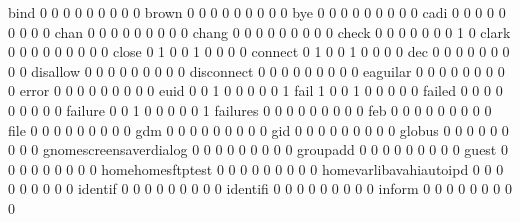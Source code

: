 \documentclass[compress,8pt]{beamer}
\begin{document}
\begin{frame}
\begin{Schunk}
  bind                                       0   0   0   0   0   0   0   0   0
  brown                                      0   0   0   0   0   0   0   0   0
  bye                                        0   0   0   0   0   0   0   0   0
  cadi                                       0   0   0   0   0   0   0   0   0
  chan                                       0   0   0   0   0   0   0   0   0
  chang                                      0   0   0   0   0   0   0   0   0
  check                                      0   0   0   0   0   0   0   1   0
  clark                                      0   0   0   0   0   0   0   0   0
  close                                      0   1   0   0   1   0   0   0   0
  connect                                    0   1   0   0   1   0   0   0   0
  dec                                        0   0   0   0   0   0   0   0   0
  disallow                                   0   0   0   0   0   0   0   0   0
  disconnect                                 0   0   0   0   0   0   0   0   0
  eaguilar                                   0   0   0   0   0   0   0   0   0
  error                                      0   0   0   0   0   0   0   0   0
  euid                                       0   0   1   0   0   0   0   0   1
  fail                                       1   0   0   1   0   0   0   0   0
  failed                                     0   0   0   0   0   0   0   0   0
  failure                                    0   0   1   0   0   0   0   0   1
  failures                                   0   0   0   0   0   0   0   0   0
  feb                                        0   0   0   0   0   0   0   0   0
  file                                       0   0   0   0   0   0   0   0   0
  gdm                                        0   0   0   0   0   0   0   0   0
  gid                                        0   0   0   0   0   0   0   0   0
  globus                                     0   0   0   0   0   0   0   0   0
  gnomescreensaverdialog                     0   0   0   0   0   0   0   0   0
  groupadd                                   0   0   0   0   0   0   0   0   0
  guest                                      0   0   0   0   0   0   0   0   0
  homehomesftptest                           0   0   0   0   0   0   0   0   0
  homevarlibavahiautoipd                     0   0   0   0   0   0   0   0   0
  identif                                    0   0   0   0   0   0   0   0   0
  identifi                                   0   0   0   0   0   0   0   0   0
  inform                                     0   0   0   0   0   0   0   0   0

\end{Schunk}
\end{frame}
\end{document}
